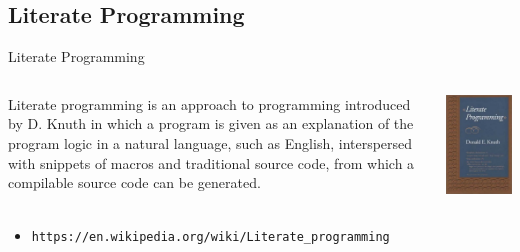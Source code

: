 \documentclass{beamer}
\begin{document}

\subsection[Literate Programming]{Literate Programming}

\begin{frame}{Literate Programming}
	\begin{center}
	\begin{columns}
	\begin{block}{}
	\begin{center}
	Literate programming is an approach to programming introduced by D. Knuth in which a program is given as an explanation of the program logic in a natural language, such as English, interspersed with snippets of macros and traditional source code, from which a compilable source code can be generated.
	\end{center}
	\end{block}
	  \includegraphics[height=\linewidth]{figs/Literate_Programming_book_cover.jpg}
	\end{columns}
	\end{center}
	
      \begin{itemize}
	\item \begin{footnotesize}
	\texttt{https://en.wikipedia.org/wiki/Literate\_programming}	                                                                  \end{footnotesize}
	
      \end{itemize}
\end{frame}
\end{document}
